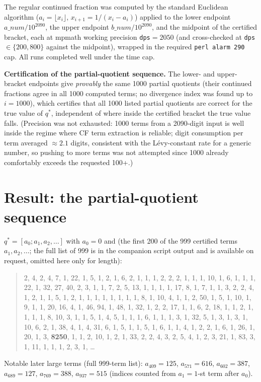 \documentclass[11pt]{article}
\begin{document}
The regular continued fraction was computed by the standard Euclidean algorithm
($a_i=\lfloor x_i\rfloor$, $x_{i+1}=1/(x_i-a_i)$) applied to the lower endpoint $a\_num/10^{2090}$,
the upper endpoint $b\_num/10^{2090}$, and the midpoint of the certified bracket, each at mpmath
working precision \texttt{dps}$=2050$ (and cross-checked at \texttt{dps}$\in\{200,800\}$ against
the midpoint), wrapped in the required \texttt{perl alarm 290} cap. All runs completed well under
the time cap.

\textbf{Certification of the partial-quotient sequence.} The lower- and upper-bracket endpoints
give \emph{provably} the same 1000 partial quotients (their continued fractions agree in all 1000
computed terms; no divergence index was found up to $i=1000$), which certifies that all 1000
listed partial quotients are correct for the true value of $q^\ast$, independent of where inside
the certified bracket the true value falls. (Precision was not exhausted: 1000 terms from a
2090-digit input is well inside the regime where CF term extraction is reliable; digit consumption
per term averaged $\approx2.1$ digits, consistent with the Lévy-constant rate for a generic
number, so pushing to more terms was not attempted since 1000 already comfortably exceeds the
requested 100+.)

\section{Result: the partial-quotient sequence}

$q^\ast = [a_0;a_1,a_2,\ldots]$ with $a_0=0$ and (the first 200 of the 999 certified terms
$a_1,a_2,\ldots$; the full list of 999 is in the companion script output and is available on
request, omitted here only for length):
\begin{quote}\footnotesize
2, 4, 2, 4, 7, 1, 22, 1, 5, 1, 2, 1, 6, 2, 1, 1, 1, 2, 2, 2, 1, 1, 1, 10, 1, 6, 1, 1, 1, 22, 1, 32,
27, 40, 2, 3, 1, 1, 7, 2, 5, 13, 1, 1, 1, 1, 17, 8, 1, 7, 1, 1, 3, 2, 2, 4, 1, 2, 1, 1, 5, 1, 2, 1,
1, 1, 1, 1, 1, 1, 1, 8, 1, 10, 4, 1, 1, 2, 50, 1, 5, 1, 10, 1, 9, 1, 1, 20, 16, 4, 1, 46, 94, 1, 48,
1, 32, 1, 2, 2, 17, 1, 1, 6, 2, 18, 1, 1, 2, 1, 1, 1, 1, 8, 10, 3, 1, 1, 5, 1, 4, 5, 1, 1, 1, 6, 1,
1, 1, 3, 1, 32, 5, 1, 3, 1, 3, 1, 10, 6, 2, 1, 38, 4, 1, 4, 31, 6, 1, 5, 1, 1, 5, 1, 6, 1, 1, 4, 1,
2, 2, 1, 6, 1, 26, 1, 20, 1, 3, \textbf{8250}, 1, 1, 2, 10, 1, 2, 1, 33, 2, 2, 4, 3, 2, 5, 4, 1, 2,
3, 21, 1, 83, 3, 1, 11, 1, 1, 1, 2, 3, 1, \ldots
\end{quote}
Notable later large terms (full 999-term list): $a_{409}=125$, $a_{571}=616$, $a_{602}=387$,
$a_{689}=127$, $a_{769}=388$, $a_{937}=515$ (indices counted from $a_1=1$-st term after $a_0$).
\end{document}
